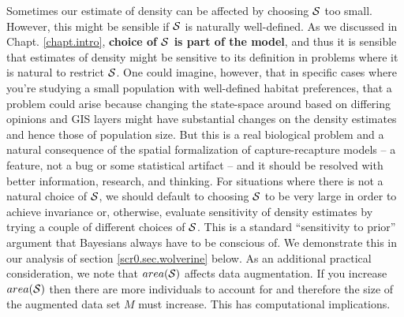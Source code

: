 Sometimes our estimate of density can be affected by choosing ${\cal
  S}$ too small. However, this might be sensible if ${\cal S}$ is
naturally well-defined. As we discussed in Chapt. \ref{chapt.intro},
{\bf choice of ${\cal S}$ is part of the model}, and thus it is
sensible that estimates of density might be sensitive to its
definition in problems where it is natural to restrict ${\cal S}$.
One could imagine, however, that in specific cases where you're
studying a small population with well-defined habitat preferences,
that a problem could arise because changing the state-space around
based on differing opinions and GIS layers might have substantial
changes on the density estimates and hence those of population
size. But this is a real biological problem and a natural consequence
of the spatial formalization of capture-recapture models -- a feature,
not a bug or some statistical artifact -- and it should be resolved
with better information, research, and thinking.  For situations where
there is not a natural choice of ${\cal S}$, we should default to
choosing ${\cal S}$ to be very large in order to achieve invariance
or, otherwise, evaluate sensitivity of density estimates by trying a
couple of different choices of ${\cal S}$. This is a standard
``sensitivity to prior'' argument that Bayesians always have to be
conscious of.  We demonstrate this in our analysis of section
\ref{scr0.sec.wolverine} below. As an additional practical
consideration, we note that $area({\cal S})$ %
affects data
augmentation. If you increase $area({\cal S})$ then there are more
individuals to account for and therefore the size of the augmented
data set $M$ must increase. This has computational implications.

